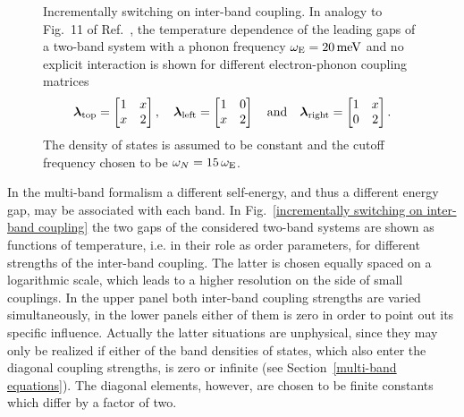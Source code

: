 \begin{figure}
    \small
    \captionsetup{singlelinecheck=off}
    
    
    
    \caption[Switching on inter-band coupling]{
        Incrementally switching on inter-band coupling. In analogy to Fig.~11 of
        Ref.~, the temperature dependence of the
        leading  gaps of a two-band system with a phonon
        frequency $\omega \sb{\text{E}} = 20 \, \mathrm{meV}$ and no explicit
         interaction is shown for different electron-phonon
        coupling matrices
        \begin{equation*}
            \boldsymbol \lambda \sb{\text{top}} =
            \begin{bmatrix}
                1 & x \\
                x & 2
            \end{bmatrix},
            \quad
            \boldsymbol \lambda \sb{\text{left}} =
            \begin{bmatrix}
                1 & 0 \\
                x & 2
            \end{bmatrix}
            \quad \text{and} \quad
            \boldsymbol \lambda \sb{\text{right}} =
            \begin{bmatrix}
                1 & x \\
                0 & 2
            \end{bmatrix}.
        \end{equation*}
        The density of states is assumed to be constant and the cutoff frequency
        chosen to be $\omega_N = 15 \, \omega \sb{\text{E}}$.
        }
    \label{incrementally switching on inter-band coupling}
\end{figure}
%
In the multi-band formalism a different self-energy, and thus a different energy
gap, may be associated with each band. In Fig.~\ref{incrementally switching on
inter-band coupling} the two gaps of the considered two-band systems are shown
as functions of temperature, i.e. in their role as order parameters, for
different strengths of the inter-band coupling. The latter is chosen equally
spaced on a logarithmic scale, which leads to a higher resolution on the side of
small couplings. In the upper panel both inter-band coupling strengths are
varied simultaneously, in the lower panels either of them is zero in order to
point out its specific influence. Actually the latter situations are unphysical,
since they may only be realized if either of the band densities of states, which
also enter the diagonal coupling strengths, is zero or infinite (see
Section~\ref{multi-band equations}). The diagonal elements, however, are chosen
to be finite constants which differ by a factor of two.

